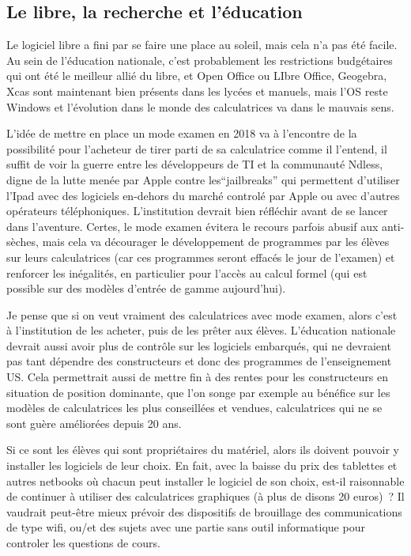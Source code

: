 \documentclass[a4paper,11pt]{book}
\begin{document}
\begin{giacjshere}
\section{Le libre, la recherche et l'\'education}
Le logiciel libre a fini par se faire une place au soleil,
mais cela n'a pas \'et\'e facile. Au sein de l'\'education
nationale, c'est probablement les restrictions budg\'etaires qui ont \'et\'e
le meilleur alli\'e du libre, et Open Office ou LIbre Office,
Geogebra, Xcas sont maintenant bien pr\'esents dans
les lyc\'ees et manuels, mais l'OS reste Windows et
l'\'evolution dans le monde des calculatrices va dans le mauvais sens.

L'id\'ee de mettre en place un mode examen en 2018 va \`a l'encontre
de la possibilit\'e pour l'acheteur de tirer parti de sa calculatrice
comme il l'entend, il suffit de voir la guerre entre les
d\'eveloppeurs de TI et la communaut\'e Ndless, digne
de la lutte men\'ee par Apple contre les``jailbreaks''
qui permettent d'utiliser l'Ipad avec des logiciels en-dehors
du march\'e control\'e par Apple ou avec d'autres op\'erateurs
t\'el\'ephoniques. L'institution devrait bien r\'efl\'echir avant de
se lancer dans l'aventure. Certes, le mode examen \'evitera le
recours parfois abusif aux anti-s\`eches, mais cela va d\'ecourager
le d\'eveloppement de programmes par les \'el\`eves sur leurs
calculatrices (car ces programmes seront effac\'es le jour de
l'examen) et renforcer les in\'egalit\'es, en particulier pour
l'acc\`es au calcul formel (qui est possible sur des mod\`eles
d'entr\'ee de gamme aujourd'hui).

Je pense que si on veut vraiment des calculatrices avec mode examen,
alors c'est \`a l'institution de les acheter, puis de les 
pr\^eter aux \'el\`eves. L'\'education nationale devrait aussi
avoir plus de contr\^ole sur les logiciels
embarqu\'es, qui ne devraient pas tant
d\'ependre des constructeurs
et donc des programmes de l'enseignement US. Cela permettrait
aussi de mettre fin \`a des rentes pour les constructeurs
en situation de position dominante, que l'on songe par
exemple au b\'en\'efice sur les mod\`eles de calculatrices les plus
conseill\'ees et vendues, calculatrices qui ne se sont
gu\`ere am\'elior\'ees depuis 20 ans.

Si ce sont les \'el\`eves qui sont propri\'etaires du mat\'eriel, alors
ils doivent pouvoir y installer les logiciels de leur choix.
En fait, avec la baisse du prix des tablettes et autres
netbooks o\`u chacun peut installer le logiciel de son
choix, est-il raisonnable de continuer \`a utiliser
des calculatrices graphiques (\`a plus de disons 20 euros)~? Il vaudrait
peut-\^etre mieux pr\'evoir des dispositifs de brouillage
des communications de type wifi, ou/et des sujets avec
une partie sans outil informatique pour controler les questions
de cours.


\end{giacjshere}
\end{document}
